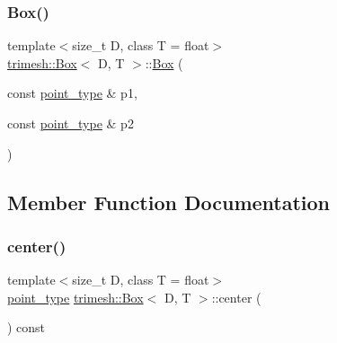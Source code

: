 \mbox{\label{classtrimesh_1_1Box_a42a3734ab4a5dd6107e1ba609b7b3911}} 
\subsubsection{\texorpdfstring{Box()}{Box()}\hspace{0.1cm}{\footnotesize\ttfamily [3/3]}}
{\footnotesize\ttfamily template$<$size\+\_\+t D, class T = float$>$ \\
\hyperlink{classtrimesh_1_1Box}{trimesh\+::\+Box}$<$ D, T $>$\+::\hyperlink{classtrimesh_1_1Box}{Box} (\begin{DoxyParamCaption}\item[{const \hyperlink{classtrimesh_1_1Box_a208c806781f96a7001491a275dfa7655}{point\+\_\+type} \&}]{p1,  }\item[{const \hyperlink{classtrimesh_1_1Box_a208c806781f96a7001491a275dfa7655}{point\+\_\+type} \&}]{p2 }\end{DoxyParamCaption})\hspace{0.3cm}{\ttfamily [inline]}}



\subsection{Member Function Documentation}
\mbox{\label{classtrimesh_1_1Box_a39edf4c682b2b1d8b8526124efa74413}} 
\subsubsection{\texorpdfstring{center()}{center()}}
{\footnotesize\ttfamily template$<$size\+\_\+t D, class T = float$>$ \\
\hyperlink{classtrimesh_1_1Box_a208c806781f96a7001491a275dfa7655}{point\+\_\+type} \hyperlink{classtrimesh_1_1Box}{trimesh\+::\+Box}$<$ D, T $>$\+::center (\begin{DoxyParamCaption}{ }\end{DoxyParamCaption}) const\hspace{0.3cm}{\ttfamily [inline]}}

\mbox{\label{classtrimesh_1_1Box_aff5802052cfb630fa70815659a37384e}} 
